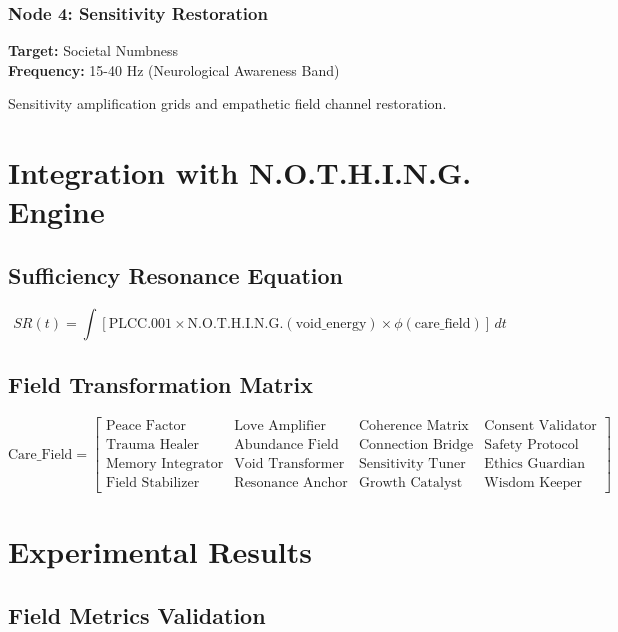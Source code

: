 \documentclass[12pt,a4paper]{article}
\begin{document}
\subsubsection{Node 4: Sensitivity Restoration}
\textbf{Target:} Societal Numbness \\
\textbf{Frequency:} 15-40 Hz (Neurological Awareness Band)

Sensitivity amplification grids and empathetic field channel restoration.

\section{Integration with N.O.T.H.I.N.G. Engine}

\subsection{Sufficiency Resonance Equation}

\begin{equation}
SR(t) = \int [\text{PLCC.001} \times \text{N.O.T.H.I.N.G.}(\text{void\_energy}) \times \phi(\text{care\_field})] \, dt
\end{equation}

\subsection{Field Transformation Matrix}

\begin{equation}
\text{Care\_Field} = \begin{bmatrix}
\text{Peace Factor} & \text{Love Amplifier} & \text{Coherence Matrix} & \text{Consent Validator} \\
\text{Trauma Healer} & \text{Abundance Field} & \text{Connection Bridge} & \text{Safety Protocol} \\
\text{Memory Integrator} & \text{Void Transformer} & \text{Sensitivity Tuner} & \text{Ethics Guardian} \\
\text{Field Stabilizer} & \text{Resonance Anchor} & \text{Growth Catalyst} & \text{Wisdom Keeper}
\end{bmatrix}
\end{equation}

\section{Experimental Results}

\subsection{Field Metrics Validation}
\end{document}
